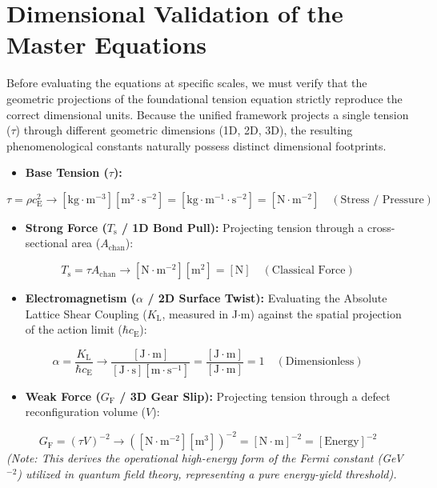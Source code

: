 \section{Dimensional Validation of the Master Equations}
Before evaluating the equations at specific scales, we must verify that the geometric projections of the foundational tension equation strictly reproduce the correct dimensional units. Because the unified framework projects a single tension ($\tau$) through different geometric dimensions (1D, 2D, 3D), the resulting phenomenological constants naturally possess distinct dimensional footprints.

\begin{itemize}
    \item \textbf{Base Tension ($\tau$):}
\end{itemize}
\begin{equation}
    \tau = \rho c_{\mathrm{E}}^2 \to [\text{kg} \cdot \text{m}^{-3}][\text{m}^2 \cdot \text{s}^{-2}] = [\text{kg} \cdot \text{m}^{-1} \cdot \text{s}^{-2}] = [\text{N} \cdot \text{m}^{-2}] \quad (\text{Stress / Pressure})
\end{equation}

\begin{itemize}
    \item \textbf{Strong Force ($T_{\mathrm{s}}$ / 1D Bond Pull):} Projecting tension through a cross-sectional area ($A_{\mathrm{chan}}$):
\end{itemize}
\begin{equation}
    T_{\mathrm{s}} = \tau A_{\mathrm{chan}} \to [\text{N} \cdot \text{m}^{-2}][\text{m}^2] = [\text{N}] \quad (\text{Classical Force})
\end{equation}

\begin{itemize}
    \item \textbf{Electromagnetism ($\alpha$ / 2D Surface Twist):} Evaluating the Absolute Lattice Shear Coupling ($K_{\mathrm{L}}$, measured in J$\cdot$m) against the spatial projection of the action limit ($\hbar c_{\mathrm{E}}$):
\end{itemize}
\begin{equation}
    \alpha = \frac{K_{\mathrm{L}}}{\hbar c_{\mathrm{E}}} \to \frac{[\text{J} \cdot \text{m}]}{[\text{J} \cdot \text{s}][\text{m} \cdot \text{s}^{-1}]} = \frac{[\text{J} \cdot \text{m}]}{[\text{J} \cdot \text{m}]} = 1 \quad (\text{Dimensionless})
\end{equation}

\begin{itemize}
    \item \textbf{Weak Force ($G_{\mathrm{F}}$ / 3D Gear Slip):} Projecting tension through a defect reconfiguration volume ($V$):
\end{itemize}
\begin{equation}
    G_{\mathrm{F}} = (\tau V)^{-2} \to \left([\text{N} \cdot \text{m}^{-2}][\text{m}^3]\right)^{-2} = [\text{N} \cdot \text{m}]^{-2} = [\text{Energy}]^{-2}
\end{equation}
\textit{(Note: This derives the operational high-energy form of the Fermi constant (GeV$^{-2}$) utilized in quantum field theory, representing a pure energy-yield threshold).}

